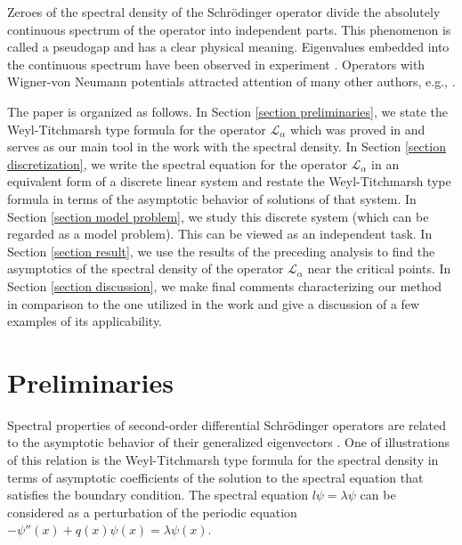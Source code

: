 \documentclass[a4paper,oneside,12pt]{amsart}
\begin{document}
Zeroes of the  spectral density of the Schr\"odinger operator
divide the absolutely continuous spectrum of the operator into
independent parts. This phenomenon is called a pseudogap and has a
clear physical meaning. Eigenvalues embedded into the continuous
spectrum have been observed in experiment
\cite{Capasso-et-al-1992}. Operators with Wigner-von Neumann
potentials attracted attention of many other authors, e.g.,
\cite{Buslaev-Matveev-1970,Buslaev-Skriganov-1974,Matveev-1973,Hinton-Klaus-Shaw-1991,Klaus-1991,Behncke-1994,Behncke-1991-II,
Behncke-1991-I,Kurasov-1996,Kurasov-1992,Kurasov-Naboko-2007,Nesterov-2007}.

The paper is organized  as follows. In Section \ref{section
preliminaries}, we state the Weyl-Titchmarsh type formula for the
operator $\mathcal L_{\alpha}$ which was proved in
\cite{Kurasov-Simonov-2011} and serves as our main tool in the
work with the spectral density. In Section \ref{section
discretization}, we write the spectral equation for the operator
$\mathcal L_{\alpha}$ in an equivalent form of a discrete linear
system and restate the Weyl-Titchmarsh type formula in terms of
the asymptotic behavior of solutions of that system. In Section
\ref{section model problem}, we study this discrete system (which
can be regarded as a model problem). This can be viewed as an
independent task. In Section \ref{section result}, we use the
results of the preceding analysis to find the asymptotics of the
spectral density of the operator $\mathcal L_{\alpha}$ near the
critical points. In Section \ref{section discussion}, we make
final comments characterizing our method in comparison to the one
utilized in the work \cite{Hinton-Klaus-Shaw-1991} and give a discussion of a few examples of its applicability.

\section{Preliminaries}\label{section preliminaries}
Spectral properties of second-order differential Schr\"odinger operators are related to the asymptotic behavior of their generalized eigenvectors \cite{Gilbert-Pearson-1987}. One of illustrations of this relation is the Weyl-Titchmarsh type formula for the spectral density in terms of asymptotic coefficients of the solution to the spectral equation that satisfies the boundary condition. The spectral equation $l\psi=\lambda\psi$ can be considered as a perturbation of the periodic equation $-\psi''(x)+q(x)\psi(x)=\lambda\psi(x)$.
\end{document}
